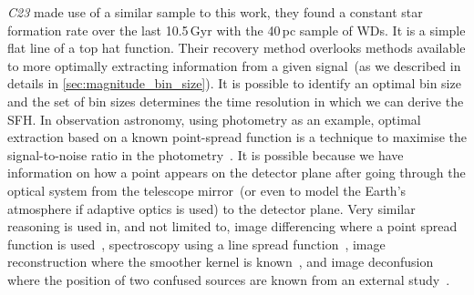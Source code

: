 \documentclass[fleqn,usenatbib]{mnras}
\begin{document}


\textit{C23} made use of a similar sample to this work, they found a constant
star formation rate over the last 10.5\,Gyr with the 40\,pc sample of WDs.
It is a simple flat line of a top hat function. Their recovery method overlooks
methods available to more optimally extracting information from a given
signal~(as we described in details in \ref{sec:magnitude_bin_size}). It is 
possible to identify an optimal bin size and the set of bin sizes determines
the time resolution in which we can derive the SFH. In observation astronomy,
using photometry as an example, optimal extraction based on a known
point-spread function is a technique to maximise the signal-to-noise ratio in
the photometry~\citep{1980SPIE..264..171T, 1987PASP...99..191S}. It is possible
because we have information on how a point appears on the detector plane after 
going through the optical system from the telescope mirror~(or even to model
the Earth's atmosphere if adaptive optics is used) to the detector plane. Very 
similar reasoning is used in, and not limited to, image differencing where a
point spread function is used~\citep{1998ApJ...503..325A, 2008MNRAS.386L..77B, 
2009MNRAS.397.2099A, 2016ApJ...830...27Z}, spectroscopy using a line spread
function~\citep{1986PASP...98..609H, 1989PASP..101.1032M, 2003PASP..115..688K},
image reconstruction where the smoother kernel is
known~\citep{1972JOSA...62...55R, 1974AJ.....79..745L}, and image
deconfusion where the position of two confused sources are known from an
external study~\citep{2015A&A...582A..15M}.
\end{document}
